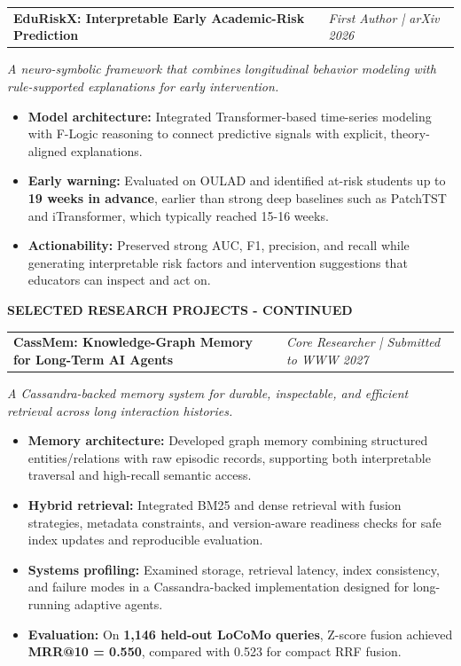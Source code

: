 \documentclass[10pt,a4paper]{article}
\makeatletter
\newcommand{\cvsection}[1]{%
  \vspace{0.65em}%
  \noindent
  {\color{navy}\fontsize{11.8}{13.2}\selectfont\bfseries\MakeUppercase{#1}}\par
  \vspace{0.09em}{\color{teal}\hrule height 0.7pt}\vspace{0.34em}%
}
\newcommand{\project}[2]{%
  \vspace{0.32em}%
  \begin{tabularx}{\textwidth}{@{}X>{\raggedleft\arraybackslash}p{5.35cm}@{}}
    {\color{navy}\fontsize{10.35}{11.6}\selectfont\bfseries #1} &
    {\color{muted}\fontsize{8.65}{10.1}\selectfont\itshape #2}
  \end{tabularx}%
  \vspace{-0.16em}%
}
\newcommand{\summaryline}[1]{%
  {\color{muted}\fontsize{8.9}{10.6}\selectfont\itshape #1}\par\vspace{0.05em}%
}
\newcommand{\metric}[1]{{\color{teal}\bfseries #1}}
\makeatother
\begin{document}
\project{EduRiskX: Interpretable Early Academic-Risk Prediction}{First Author | arXiv 2026}
\summaryline{A neuro-symbolic framework that combines longitudinal behavior modeling with rule-supported explanations for early intervention.}
\begin{itemize}
  \item \textbf{Model architecture:} Integrated Transformer-based time-series modeling with F-Logic reasoning to connect predictive signals with explicit, theory-aligned explanations.
  \item \textbf{Early warning:} Evaluated on OULAD and identified at-risk students up to \metric{19 weeks in advance}, earlier than strong deep baselines such as PatchTST and iTransformer, which typically reached 15-16 weeks.
  \item \textbf{Actionability:} Preserved strong AUC, F1, precision, and recall while generating interpretable risk factors and intervention suggestions that educators can inspect and act on.
\end{itemize}

\newpage

\cvsection{Selected Research Projects - Continued}

\project{CassMem: Knowledge-Graph Memory for Long-Term AI Agents}{Core Researcher | Submitted to WWW 2027}
\summaryline{A Cassandra-backed memory system for durable, inspectable, and efficient retrieval across long interaction histories.}
\begin{itemize}
  \item \textbf{Memory architecture:} Developed graph memory combining structured entities/relations with raw episodic records, supporting both interpretable traversal and high-recall semantic access.
  \item \textbf{Hybrid retrieval:} Integrated BM25 and dense retrieval with fusion strategies, metadata constraints, and version-aware readiness checks for safe index updates and reproducible evaluation.
  \item \textbf{Systems profiling:} Examined storage, retrieval latency, index consistency, and failure modes in a Cassandra-backed implementation designed for long-running adaptive agents.
  \item \textbf{Evaluation:} On \metric{1,146 held-out LoCoMo queries}, Z-score fusion achieved \metric{MRR@10 = 0.550}, compared with 0.523 for compact RRF fusion.
\end{itemize}
\end{document}
